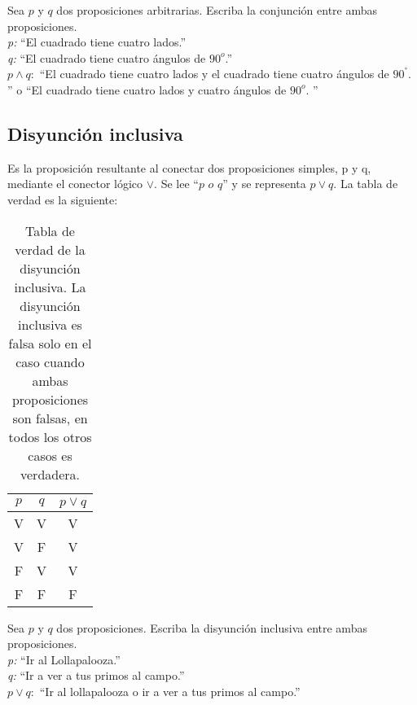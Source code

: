 \begin{myexample}
Sea $p$ y $q$ dos proposiciones arbitrarias. Escriba la conjunción entre ambas proposiciones.\\

\noindent\textit{p:} ``El cuadrado tiene cuatro lados.''\\
\textit{q:} ``El cuadrado tiene cuatro ángulos de $90^{o}$.''\\
\textit{$p\wedge q:$} ``El cuadrado tiene cuatro lados y el cuadrado tiene cuatro ángulos de $90^{°}$. '' o ``El cuadrado tiene cuatro lados y cuatro ángulos de $90^{o}$. ''
\end{myexample}


\subsection{Disyunción inclusiva}
Es la proposición resultante al conectar dos proposiciones simples, p y q, mediante el conector lógico $\vee$. Se lee ``$p$ $o$ $q$'' y se representa $p \vee q$. La tabla de verdad es la siguiente:
\begin{table}[h!]
	\begin{center}
		\begin{tabular}{|c|c|c|}
\hline
$p$&$q$&$p \vee q$\\
\hline
V&V&V\\
\hline
V&F&V\\
\hline
F&V&V\\
\hline
F&F&F\\
\hline
		\end{tabular}
	\end{center}
\caption[Tabla de verdad del operador lógico disyunción inclusiva]{Tabla de verdad de la disyunción inclusiva. La disyunción inclusiva es falsa solo en el caso cuando ambas proposiciones son falsas, en todos los otros casos es verdadera.}
\end{table}

\begin{myexample}
Sea $p$ y $q$ dos proposiciones. Escriba la disyunción inclusiva entre ambas proposiciones.\\

\noindent\textit{p:} ``Ir al Lollapalooza.''\\
\textit{q:} ``Ir a ver a tus primos al campo.''\\
\textit{$p\vee q:$} ``Ir al lollapalooza o ir a ver a tus primos al campo.''
\end{myexample}


